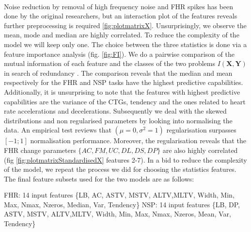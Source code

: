 \documentclass[11pt,a4paper]{article}
\begin{document}
\paragraph{}
Noise reduction by removal of high frequency noise and FHR spikes has been done by the original researchers, but an interaction plot of the features reveals further preprocessing is required \ref{fig:plotmatrixX}. Unsurprisingly, we observe the mean, mode and median are highly correlated.
To reduce the complexity of the model we will keep only one. The choice between the three statistics is done via a feature importance analysis (fig. \ref{fig:FI}). We do a pairwise comparison of the mutual information of each feature and the classes of the two problems \(I(\boldsymbol{X},\boldsymbol{Y})\) in search of redundancy \autocite{FeatureImportance}. The comparison reveals that the median and mean respectively for the FHR and NSP tasks have the highest predictive capabilities. Additionally, it is unsurprising to note that the features with highest predictive capabilities are the variance of the CTGs, tendency and the ones related to heart rate accelerations and decelerations. Subsequently we deal with the skewed distributions and non regularised parameters by looking into normalising the data. An empirical test reviews that \((\mu = 0, \sigma^2 = 1)\) regularisation surpasses \([-1;1]\) normalisation performance. Moreover, the regularisation reveals that the FHR change parameters \(\{AC,FM,UC,DL,DS,DP\}\) are also highly correlated (fig \ref{fig:plotmatrixStandardisedX} features 2-7). In a bid to reduce the complexity of the model, we repeat the process we did for choosing the statistics features. The final feature subsets used for the two models are as follows:
\begin{outline}
  \1 FHR: 14 input features \{LB, AC, ASTV, MSTV, ALTV,MLTV, Width, Min, Max, Nmax, Nzeros, Median, Var, Tendency\}
  \1 NSP: 14 input features \{LB, DP, ASTV, MSTV, ALTV,MLTV, Width, Min, Max, Nmax, Nzeros, Mean, Var, Tendency\}
\end{outline}
\end{document}
